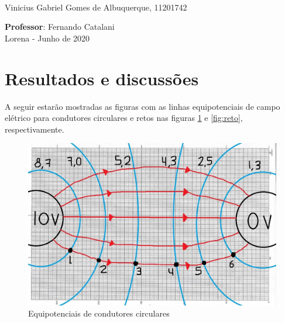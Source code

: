 \documentclass[a4paper,12pt]{article}
\begin{document}
\vspace{4cm}

\large{
  \vspace{0.4cm} \\
  Vinicius Gabriel Gomes de Albuquerque, 11201742}
\vspace{3.0cm}

\begin{center}
	\textbf{Professor}: Fernando Catalani \\
	\vspace{3cm}
	Lorena - Junho de 2020
\end{center}

\newpage

\section*{Resultados e discussões}
A seguir estarão mostradas as figuras com as linhas equipotenciais de campo elétrico para condutores circulares e retos nas figuras \ref{fig:circular} e \ref{fig:reto}, respectivamente.

\begin{figure}[!h]
   \centering
   \caption{\label{fig:circular}Equipotenciais de condutores circulares}
   \includegraphics[scale=0.4]{1}
\end{figure}
\end{document}
